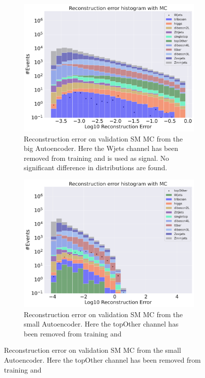 \begin{figure}[h!]
\begin{subfigure}{.45\textwidth}
        \includegraphics[width=\textwidth]{Figures/AE_testing/big/b_data_recon_big_rm3_feats_sig_Wjets.pdf}
        \caption{Reconstruction error on validation SM MC from the big Autoencoder. Here the Wjets channel has been removed from training and 
        is used as signal. No significant difference in distributions are found. }
        \label{fig:ae_big_Wjets}
    \end{subfigure}
    \hfill 
    \begin{subfigure}{.45\textwidth}
        \includegraphics[width=\textwidth]{Figures/AE_testing/small/b_data_recon_big_rm3_feats_sig_topOther.pdf}
        \caption{Reconstruction error on validation SM MC from the small Autoencoder. Here the topOther channel has been removed from training and 
}
\end{subfigure}
\end{figure}
